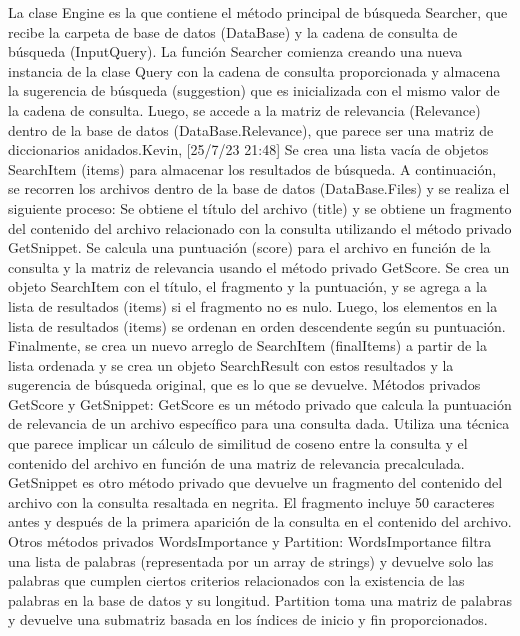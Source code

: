 \documentclass[a4paper,12pt]{article}
\begin{document}
La clase Engine es la que contiene el método principal de búsqueda Searcher, que recibe la carpeta de base de datos (DataBase) y la cadena de consulta de búsqueda (InputQuery).
La función Searcher comienza creando una nueva instancia de la clase Query con la cadena de consulta proporcionada y almacena la sugerencia de búsqueda (suggestion) que es inicializada con el mismo valor de la cadena de consulta.
Luego, se accede a la matriz de relevancia (Relevance) dentro de la base de datos (DataBase.Relevance), que parece ser una matriz de diccionarios anidados.Kevin, [25/7/23 21:48]
Se crea una lista vacía de objetos SearchItem (items) para almacenar los resultados de búsqueda.
A continuación, se recorren los archivos dentro de la base de datos (DataBase.Files) y se realiza el siguiente proceso:
Se obtiene el título del archivo (title) y se obtiene un fragmento del contenido del archivo relacionado con la consulta utilizando el método privado GetSnippet.
Se calcula una puntuación (score) para el archivo en función de la consulta y la matriz de relevancia usando el método privado GetScore.
Se crea un objeto SearchItem con el título, el fragmento y la puntuación, y se agrega a la lista de resultados (items) si el fragmento no es nulo.
Luego, los elementos en la lista de resultados (items) se ordenan en orden descendente según su puntuación.
Finalmente, se crea un nuevo arreglo de SearchItem (finalItems) a partir de la lista ordenada y se crea un objeto SearchResult con estos resultados y la sugerencia de búsqueda original, que es lo que se devuelve.
Métodos privados GetScore y GetSnippet:
GetScore es un método privado que calcula la puntuación de relevancia de un archivo específico para una consulta dada. Utiliza una técnica que parece implicar un cálculo de similitud de coseno entre la consulta y el contenido del archivo en función de una matriz de relevancia precalculada.
GetSnippet es otro método privado que devuelve un fragmento del contenido del archivo con la consulta resaltada en negrita. El fragmento incluye 50 caracteres antes y después de la primera aparición de la consulta en el contenido del archivo.
Otros métodos privados WordsImportance y Partition:
WordsImportance filtra una lista de palabras (representada por un array de strings) y devuelve solo las palabras que cumplen ciertos criterios relacionados con la existencia de las palabras en la base de datos y su longitud.
Partition toma una matriz de palabras y devuelve una submatriz basada en los índices de inicio y fin proporcionados.
\end{document}
